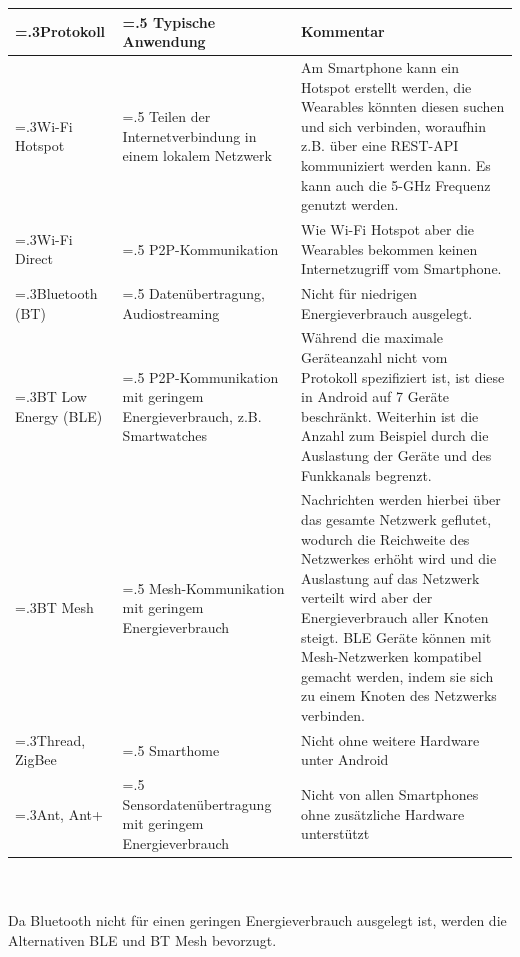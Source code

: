 \begin{minipage}{\linewidth}
        \renewcommand\footnoterule{}
        \renewcommand{\thefootnote}{\alph{footnote}}
	\label{tab:p2p_protocols}
	\begin{tabularx}{\linewidth}{>{\hsize=.3\hsize}X|>{\hsize=.5\hsize}X|X}
		Protokoll & Typische Anwendung & Kommentar\\
		\hline
		Wi-Fi Hotspot & Teilen der Internetverbindung in einem lokalem Netzwerk & Am Smartphone kann ein Hotspot erstellt werden, die Wearables könnten diesen suchen und sich verbinden, woraufhin z.B. über eine REST-API kommuniziert werden kann.
		Es kann auch die 5-GHz Frequenz genutzt werden.\\
		Wi-Fi Direct & P2P-Kommunikation & Wie Wi-Fi Hotspot aber die Wearables bekommen keinen Internetzugriff vom Smartphone.\\
		Bluetooth (BT) & Datenübertragung, Audiostreaming & Nicht für niedrigen Energieverbrauch ausgelegt.\\
		BT Low Energy (BLE) & P2P-Kommunikation mit geringem Energieverbrauch, z.B. Smartwatches & Während die maximale Geräteanzahl nicht vom Protokoll spezifiziert ist, ist diese in Android auf 7 Geräte beschränkt\footnotemark[1].
		Weiterhin ist die Anzahl zum Beispiel durch die Auslastung der Geräte und des Funkkanals begrenzt.\\
		BT Mesh & Mesh-Kommunikation mit geringem Energieverbrauch & Nachrichten werden hierbei über das gesamte Netzwerk geflutet, wodurch die Reichweite des Netzwerkes erhöht wird und die Auslastung auf das Netzwerk verteilt wird aber der Energieverbrauch aller Knoten steigt.
		BLE Geräte können mit Mesh-Netzwerken kompatibel gemacht werden, indem sie sich zu einem Knoten des Netzwerks verbinden.\\
		Thread, ZigBee & Smarthome & Nicht ohne weitere Hardware unter Android\\
		Ant, Ant+ & Sen\-sor\-da\-ten\-über\-tra\-gung mit geringem Energieverbrauch & Nicht von allen Smartphones ohne zusätzliche Hardware unterstützt\\
	\end{tabularx}
\end{minipage}\\\\
Da Bluetooth nicht für einen geringen Energieverbrauch ausgelegt ist, werden die Alternativen BLE und BT Mesh bevorzugt.
